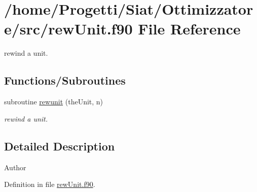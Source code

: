 \hypertarget{rew_unit_8f90}{\section{/home/\-Progetti/\-Siat/\-Ottimizzatore/src/rew\-Unit.f90 File Reference}
\label{rew_unit_8f90}
}


rewind a unit.  


\subsection*{Functions/\-Subroutines}
\begin{DoxyCompactItemize}
\item 
subroutine \hyperlink{rew_unit_8f90_ad71be38edfc5b3981be9de4cd607daa6}{rewunit} (the\-Unit, n)
\begin{DoxyCompactList}\small\item\em rewind a unit. \end{DoxyCompactList}\end{DoxyCompactItemize}


\subsection{Detailed Description}
\begin{DoxyAuthor}{Author}

\end{DoxyAuthor}


Definition in file \hyperlink{rew_unit_8f90_source}{rew\-Unit.\-f90}.



